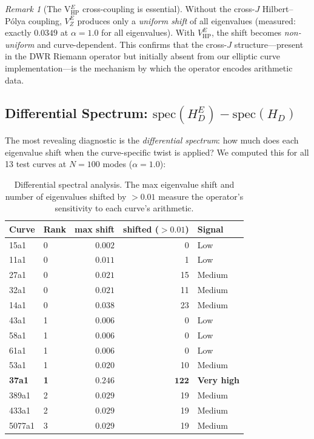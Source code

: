 \documentclass[11pt,a4paper]{article}
\theoremstyle{plain}
\theoremstyle{definition}
\theoremstyle{remark}
\newtheorem{remark}[theorem]{Remark}
\begin{document}
\begin{remark}[The V$_{\text{HP}}^E$ cross-coupling is essential]
Without the cross-$J$ Hilbert--P\'olya coupling, $V_Z^E$ produces only a \emph{uniform shift} of all eigenvalues (measured: exactly $0.0349$ at $\alpha = 1.0$ for all eigenvalues). With $V_{\text{HP}}^E$, the shift becomes \emph{non-uniform} and curve-dependent. This confirms that the cross-$J$ structure---present in the DWR Riemann operator but initially absent from our elliptic curve implementation---is the mechanism by which the operator encodes arithmetic data.
\end{remark}

\subsection{Differential Spectrum: $\text{spec}(H_D^E) - \text{spec}(H_D)$}

The most revealing diagnostic is the \emph{differential spectrum}: how much does each eigenvalue shift when the curve-specific twist is applied? We computed this for all 13 test curves at $N = 100$ modes ($\alpha = 1.0$):

\begin{table}[H]
\centering
\caption{Differential spectral analysis. The max eigenvalue shift and number of eigenvalues shifted by $> 0.01$ measure the operator's sensitivity to each curve's arithmetic.}
\label{tab:differential}
\begin{tabular}{llrrl}
\toprule
Curve & Rank & max shift & shifted ($>0.01$) & Signal \\
\midrule
15a1 & 0 & $0.002$ & 0 & Low \\
11a1 & 0 & $0.011$ & 1 & Low \\
27a1 & 0 & $0.021$ & 15 & Medium \\
32a1 & 0 & $0.021$ & 11 & Medium \\
14a1 & 0 & $0.038$ & 23 & Medium \\
\midrule
43a1 & 1 & $0.006$ & 0 & Low \\
58a1 & 1 & $0.006$ & 0 & Low \\
61a1 & 1 & $0.006$ & 0 & Low \\
53a1 & 1 & $0.020$ & 10 & Medium \\
\textbf{37a1} & \textbf{1} & $\mathbf{0.246}$ & $\mathbf{122}$ & \textbf{Very high} \\
\midrule
389a1 & 2 & $0.029$ & 19 & Medium \\
433a1 & 2 & $0.029$ & 19 & Medium \\
5077a1 & 3 & $0.029$ & 19 & Medium \\
\bottomrule
\end{tabular}
\end{table}
\end{document}
